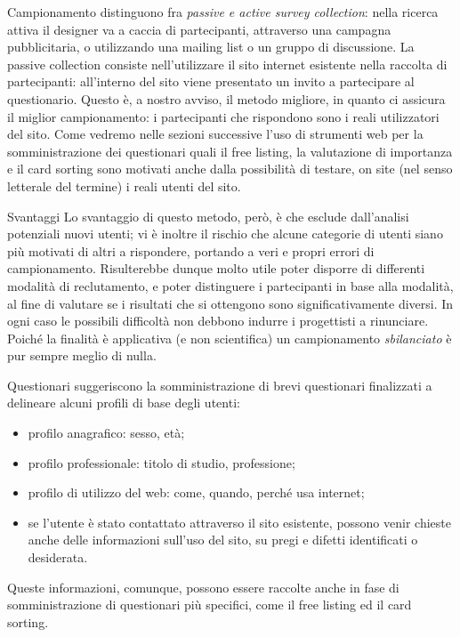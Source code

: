 \documentclass[pdf,mpa]{prosper}
\begin{document}
\begin{slide}{Campionamento}
\cite{FuccellaPizzolato1998} distinguono fra \textit{passive e active survey collection}: nella ricerca attiva il designer va a caccia di partecipanti, attraverso una campagna pubblicitaria, o utilizzando una mailing list o un gruppo di discussione. La passive collection consiste nell'utilizzare il sito internet esistente nella raccolta di partecipanti: all'interno del sito viene presentato un invito a partecipare al questionario. Questo è, a nostro avviso, il metodo migliore, in quanto ci assicura il miglior campionamento: i partecipanti che rispondono sono i reali utilizzatori del sito. Come vedremo nelle sezioni successive l'uso di strumenti web per la somministrazione dei questionari quali il free listing, la valutazione di importanza e il card sorting sono motivati anche dalla possibilità di testare, on site (nel senso letterale del termine) i reali utenti del sito.
\end{slide}

\begin{slide}{Svantaggi}
Lo svantaggio di questo metodo, però, è che esclude dall'analisi potenziali nuovi utenti; vi è inoltre il rischio che alcune categorie di utenti siano più motivati di altri a rispondere, portando a veri e propri errori di campionamento. Risulterebbe dunque molto utile poter disporre di differenti modalità di reclutamento, e poter distinguere i partecipanti in base alla modalità, al fine di valutare se i risultati che si ottengono sono significativamente diversi. In ogni caso le possibili difficoltà non debbono indurre i progettisti a rinunciare. Poiché la finalità è applicativa (e non scientifica) un campionamento \textit{sbilanciato} è pur sempre meglio di nulla.
\end{slide}

\begin{slide}{Questionari}
\cite{FuccellaPizzolato1998} suggeriscono la somministrazione di brevi questionari finalizzati a delineare alcuni profili di base degli utenti:
\begin{itemize}
\item profilo anagrafico: sesso, età;
\item profilo professionale: titolo di studio, professione;
\item profilo di utilizzo del web: come, quando, perché usa internet;
\item se l'utente è stato contattato attraverso il sito esistente, possono venir chieste anche delle informazioni sull'uso del sito, su pregi e difetti identificati o desiderata.
\end{itemize}
Queste informazioni, comunque, possono essere raccolte anche in fase di somministrazione di questionari più specifici, come il free listing ed il card sorting. %
\end{slide}
\end{document}
